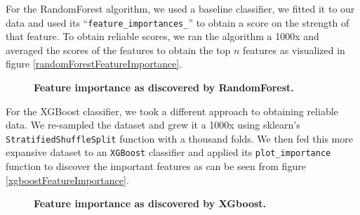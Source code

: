 \documentclass[twoside,openright,titlepage,numbers=noenddot,headinclude,%
               footinclude=true,cleardoublepage=empty,abstractoff,BCOR=5mm,%
               paper=a4,fontsize=11pt,ngerman,american]{scrreprt}
\numberwithin{theorem}{chapter}
\numberwithin{definition}{chapter}
\numberwithin{algorithm}{chapter}
\numberwithin{figure}{chapter}
\numberwithin{table}{chapter}
\numberwithin{equation}{chapter}
\begin{document}
For the RandomForest algorithm, we used a baseline classifier, we fitted it to our data and used its ``\texttt{feature\_importances\_}'' to obtain a score on the strength of that feature. To obtain reliable scores, we ran the algorithm a 1000x and averaged the scores of the features to obtain the top $n$ features as visualized in figure \ref{randomForestFeatureImportance}.

\begin{figure}[!hbtp]
\centering
    
    \caption{\textbf{Feature importance as discovered by RandomForest.} \textit{}}
\end{figure}

For the XGBoost classifier, we took a different approach to obtaining reliable data. We re-sampled the dataset and grew it a 1000x using sklearn's \texttt{StratifiedShuffleSplit} function with a thousand folds. We then fed this more expansive dataset to an \texttt{XGBoost} classifier and applied its \texttt{plot\_importance} function to discover the important features as can be seen from figure \ref{xgboostFeatureImportance}.

\begin{figure}[!hbtp]
\centering
    
    \caption{\textbf{Feature importance as discovered by XGboost.} \textit{}}
\end{figure}
\end{document}

